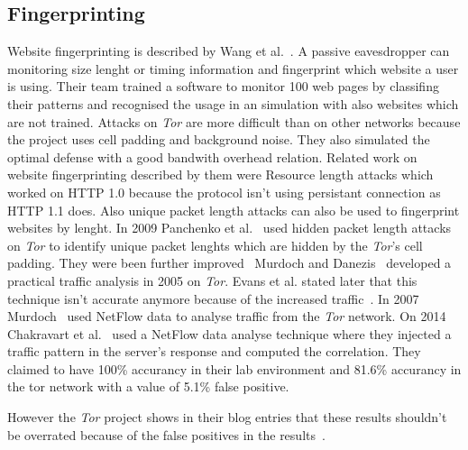 \documentclass{sig-alternate}
\begin{document}
\subsection{Fingerprinting}

Website fingerprinting is described by Wang et al.~\cite{wangeffective}. A passive eavesdropper can monitoring size lenght or timing information and fingerprint which website a user is using. Their team trained a software to monitor 100 web pages by classifing their patterns and recognised the usage in an simulation with also websites which are not trained. Attacks on \textit{Tor} are more difficult than on other networks because the project uses cell padding and background noise. They also simulated the optimal defense with a good bandwith overhead relation.
Related work on website fingerprinting described by them were Resource length attacks which worked on HTTP 1.0 because the protocol isn't using persistant connection as HTTP 1.1 does. Also unique packet length attacks can also be used to fingerprint websites by lenght. In 2009 Panchenko et al.~\cite{panchenko2011website} used hidden packet length attacks on \textit{Tor} to identify unique packet lenghts which are hidden by the \textit{Tor}'s cell padding. They were been further improved~\cite{dyer2012peek, cai2012touching, wang2013improved} Murdoch and Danezis~\cite{murdoch2005low} developed a practical traffic analysis in 2005 on \textit{Tor}. Evans et al. stated later that this technique isn't accurate anymore because of the increased traffic~\cite{evans2009practical}. In 2007 Murdoch~\cite{murdoch2007sampled} 
used NetFlow data to analyse traffic from the \textit{Tor} network. On 2014 Chakravart et al.~\cite{chakravarty2014effectiveness} used a NetFlow data analyse technique where they injected a traffic pattern in the server's response and computed the correlation. They claimed to have 100\% accurancy in their lab environment and 81.6\% accurancy in the tor network with a value of 5.1\% false positive.

However the \textit{Tor} project shows in their blog entries that these results shouldn't be overrated because of the false positives in the results~\cite{one, two}.
\newpage
\end{document}
